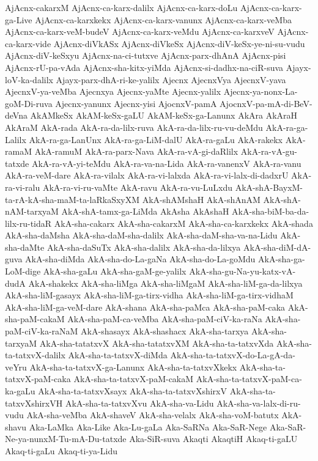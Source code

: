 {AjAcnx-cakarxM
AjAcnx-ca-karx-dalilx
AjAcnx-ca-karx-doLu
AjAcnx-ca-karx-ga-Live
AjAcnx-ca-karxkekx
AjAcnx-ca-karx-vanunx
AjAcnx-ca-karx-veMba
AjAcnx-ca-karx-veM-budeV
AjAcnx-ca-karx-veMdu
AjAcnx-ca-karxveV
AjAcnx-ca-karx-vide
AjAcnx-diVkASx
AjAcnx-diVkeSx
AjAcnx-diV-keSx-ye-ni-su-vudu
AjAcnx-diV-keSxyu
AjAcnx-na-ci-tutxve
AjAcnx-parx-dhAnA
AjAcnx-pisi
AjAcnx-rU-pa-vAda
AjAcnx-sha-kitx-yiMda
AjAcnx-si-dadhx-na-ciR-suva
Ajayx-loV-ka-dalilx
Ajayx-parx-dhA-ri-ke-yalilx
Ajecnx
AjecnxVya
AjecnxV-yava
AjecnxV-ya-veMba
Ajecnxya
Ajecnx-yaMte
Ajecnx-yalilx
Ajecnx-ya-nonx-La-goM-Di-ruva
Ajecnx-yanunx
Ajecnx-yisi
AjocnxV-pamA
AjocnxV-pa-mA-di-BeV-deVna
AkAMkeSx
AkAM-keSx-gaLU
AkAM-keSx-ga-Lanunx
AkAra
AkAraH
AkAraM
AkA-rada
AkA-ra-da-lilx-ruva
AkA-ra-da-lilx-ru-vu-deMdu
AkA-ra-ga-Lalilx
AkA-ra-ga-LanUnx
AkA-ra-ga-LiM-dalU
AkA-ra-gaLu
AkA-rakekx
AkA-ramaM
AkA-ramuM
AkA-ra-parx-Nava
AkA-ra-vA-gi-daRlilx
AkA-ra-vA-gu-tatxde
AkA-ra-vA-yi-teMdu
AkA-ra-va-na-Lida
AkA-ra-vanenxV
AkA-ra-vanu
AkA-ra-veM-dare
AkA-ra-vilalx
AkA-ra-vi-lalxda
AkA-ra-vi-lalx-di-dadxrU
AkA-ra-vi-ralu
AkA-ra-vi-ru-vaMte
AkA-ravu
AkA-ra-vu-LuLxdu
AkA-shA-BayxM-ta-rA-kA-sha-maM-ta-laRkaSxyXM
AkA-shAMshaH
AkA-shAnAM
AkA-shA-nAM-tarxyaM
AkA-shA-tamx-ga-LiMda
AkAsha
AkAshaH
AkA-sha-biM-ba-da-lilx-ru-tidaR
AkA-sha-cakarx
AkA-sha-cakarxM
AkA-sha-ca-karxkekx
AkA-shada
AkA-sha-daMsha
AkA-sha-daM-sha-dalilx
AkA-sha-daM-sha-va-na-Lidu
AkA-sha-daMte
AkA-sha-daSuTx
AkA-sha-dalilx
AkA-sha-da-lilxya
AkA-sha-diM-dA-guva
AkA-sha-diMda
AkA-sha-do-La-gaNa
AkA-sha-do-La-goMdu
AkA-sha-ga-LoM-dige
AkA-sha-gaLu
AkA-sha-gaM-ge-yalilx
AkA-sha-gu-Na-yu-katx-vA-dudA
AkA-shakekx
AkA-sha-liMga
AkA-sha-liMgaM
AkA-sha-liM-ga-da-lilxya
AkA-sha-liM-gasayx
AkA-sha-liM-ga-tirx-vidha
AkA-sha-liM-ga-tirx-vidhaM
AkA-sha-liM-ga-veM-dare
AkA-shana
AkA-sha-paMca
AkA-sha-paM-caka
AkA-sha-paM-cakaM
AkA-sha-paM-ca-veMba
AkA-sha-paM-ciV-ka-raNa
AkA-sha-paM-ciV-ka-raNaM
AkA-shasayx
AkA-shashacx
AkA-sha-tarxya
AkA-sha-tarxyaM
AkA-sha-tatatxvX
AkA-sha-tatatxvXM
AkA-sha-ta-tatxvXda
AkA-sha-ta-tatxvX-dalilx
AkA-sha-ta-tatxvX-diMda
AkA-sha-ta-tatxvX-do-La-gA-da-veYru
AkA-sha-ta-tatxvX-ga-Lanunx
AkA-sha-ta-tatxvXkekx
AkA-sha-ta-tatxvX-paM-caka
AkA-sha-ta-tatxvX-paM-cakaM
AkA-sha-ta-tatxvX-paM-ca-ka-gaLu
AkA-sha-ta-tatxvXsayx
AkA-sha-ta-tatxvXshirxV
AkA-sha-ta-tatxvXshirxVH
AkA-sha-ta-tatxvXvu
AkA-sha-va-Lidu
AkA-sha-va-lalx-di-ru-vudu
AkA-sha-veMba
AkA-shaveV
AkA-sha-velalx
AkA-sha-voM-batutx
AkA-shavu
Aka-LaMka
Aka-Like
Aka-Lu-gaLa
Aka-SaRNa
Aka-SaR-Nege
Aka-SaR-Ne-ya-nunxM-Tu-mA-Du-tatxde
Aka-SiR-suva
Akaqti
AkaqtiH
Akaq-ti-gaLU
Akaq-ti-gaLu
Akaq-ti-ya-Lidu
}
